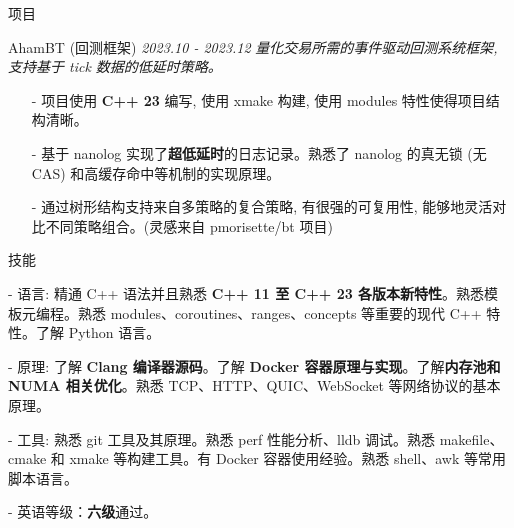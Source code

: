 \documentclass{resume} %
\begin{document}
\begin{rSection}{项目}
\begin{rSubsection}
    {AhamBT (回测框架)} {\em 2023.10 - 2023.12}
    {\textit{量化交易所需的事件驱动回测系统框架, 支持基于 tick 数据的低延时策略。}}
    {\textit{}}
    \item[]
    \begin{itemize}
        \setlength\itemsep{-0.5em}
        \item[-] 项目使用 \textbf{C++ 23} 编写, 使用 xmake 构建, 使用 modules 特性使得项目结构清晰。
        \item[-] 基于 nanolog 实现了\textbf{超低延时}的日志记录。熟悉了 nanolog 的真无锁 (无 CAS) 和高缓存命中等机制的实现原理。
        \item[-] 通过树形结构支持来自多策略的复合策略, 有很强的可复用性, 能够地灵活对比不同策略组合。(灵感来自 pmorisette/bt 项目)
    \end{itemize}
\end{rSubsection}
\end{rSection}


\begin{rSection}{技能}
\begin{rSubsection}
{}{}{}{}
\item[-] 语言: 精通 C++ 语法并且熟悉 \textbf{C++ 11 至 C++ 23 各版本新特性}。熟悉模板元编程。熟悉 modules、coroutines、ranges、concepts 等重要的现代 C++ 特性。了解 Python 语言。
\item[-] 原理: 了解 \textbf{Clang 编译器源码}。了解 \textbf{Docker 容器原理与实现}。了解\textbf{内存池和 NUMA 相关优化}。熟悉 TCP、HTTP、QUIC、WebSocket 等网络协议的基本原理。
\item[-] 工具: 熟悉 git 工具及其原理。熟悉 perf 性能分析、lldb 调试。熟悉 makefile、cmake 和 xmake 等构建工具。有 Docker 容器使用经验。熟悉 shell、awk 等常用脚本语言。
\item[-] 英语等级：\textbf{六级}通过。
\end{rSubsection}
\end{rSection}

\end{document}
